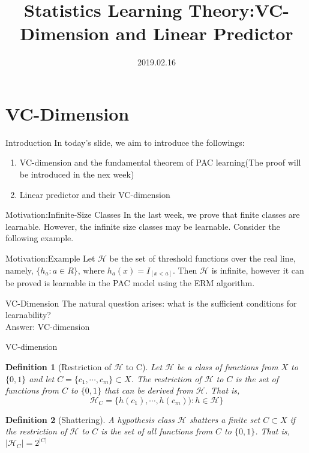 \documentclass{beamer}
\title[Introduction]{Statistics Learning Theory:VC-Dimension and Linear Predictor}
\author{}
\institute{}
\date{2019.02.16}
\newtheorem*{dfn}{Definition}
\begin{document}
\begin{frame}
  \titlepage
\end{frame}


\section{VC-Dimension}
\begin{frame}{Introduction}
	In today's slide, we aim to introduce the followings:
	\begin{enumerate}
		\item VC-dimension and the fundamental theorem of PAC learning(The proof will be introduced in the nex week)
		\item Linear predictor and their VC-dimension
	\end{enumerate}
\end{frame}
\begin{frame}{Motivation:Infinite-Size Classes}
	In the last week, we prove that finite classes are learnable. However, the infinite size classes may be learnable. Consider the following example.
\end{frame}
\begin{frame}{Motivation:Example}
	Let $\mathcal{H}$ be the set of threshold functions over the real line, namely, $\{h_a:a \in R\}$, where $h_a(x) = I_{[x<a]}$. Then $\mathcal{H}$ is infinite, however it can be proved is learnable in the PAC model using the ERM algorithm.
\end{frame}
\begin{frame}{VC-Dimension}
	The natural question arises: what is the sufficient conditions for learnability? \\
	Answer: VC-dimension
\end{frame}
\begin{frame}{VC-dimension}
	\begin{dfn}[Restriction of $\mathcal{H}$ to C]
		Let $\mathcal{H}$ be a class of functions from $X$ to $\{0,1\}$ and let $C = \{c_1,\cdots,c_m\} \subset X$. The restriction of $\mathcal{H}$ to $C$ is the set of functions from $C$ to $\{0,1\}$ that can be derived from $\mathcal{H}$. That is, 
	\[\mathcal{H}_C = \{h(c_1), \cdots, h(c_m)): h \in \mathcal{H}\}\]
	\end{dfn}
	\begin{dfn}[Shattering]
	A hypothesis class $\mathcal{H}$ shatters a finite set $C \subset X$ if the restriction of $\mathcal{H}$ to $C$ is the set of all functions from $C$ to $\{0,1\}$. That is, $|\mathcal{H}_C| = 2^{|C|}$
	\end{dfn}
\end{frame}
\end{document}
